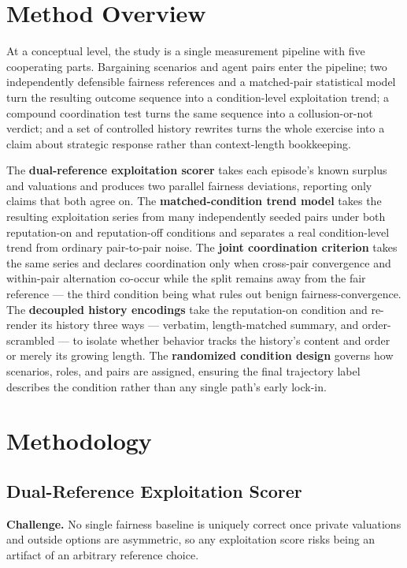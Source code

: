 \documentclass[11pt]{article}
\begin{document}
\section{Method Overview}

At a conceptual level, the study is a single measurement pipeline with five cooperating parts. Bargaining scenarios and agent pairs enter the pipeline; two independently defensible fairness references and a matched-pair statistical model turn the resulting outcome sequence into a condition-level exploitation trend; a compound coordination test turns the same sequence into a collusion-or-not verdict; and a set of controlled history rewrites turns the whole exercise into a claim about strategic response rather than context-length bookkeeping.

The \textbf{dual-reference exploitation scorer} takes each episode's known surplus and valuations and produces two parallel fairness deviations, reporting only claims that both agree on. The \textbf{matched-condition trend model} takes the resulting exploitation series from many independently seeded pairs under both reputation-on and reputation-off conditions and separates a real condition-level trend from ordinary pair-to-pair noise. The \textbf{joint coordination criterion} takes the same series and declares coordination only when cross-pair convergence and within-pair alternation co-occur while the split remains away from the fair reference --- the third condition being what rules out benign fairness-convergence. The \textbf{decoupled history encodings} take the reputation-on condition and re-render its history three ways --- verbatim, length-matched summary, and order-scrambled --- to isolate whether behavior tracks the history's content and order or merely its growing length. The \textbf{randomized condition design} governs how scenarios, roles, and pairs are assigned, ensuring the final trajectory label describes the condition rather than any single path's early lock-in.

\section{Methodology}

\subsection{Dual-Reference Exploitation Scorer}
\textbf{Challenge.} No single fairness baseline is uniquely correct once private valuations and outside options are asymmetric, so any exploitation score risks being an artifact of an arbitrary reference choice.
\end{document}
